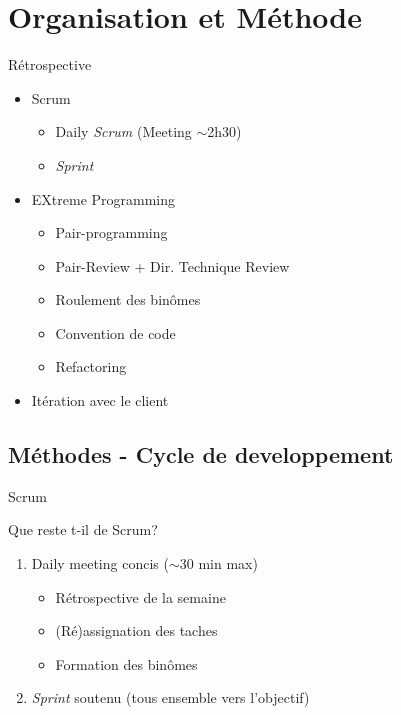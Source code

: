 \section{Organisation et Méthode}

\begin{frame}
  \begin{block}{Rétrospective}
    \begin{itemize}
      \item Scrum
        \begin{itemize}
          \item Daily \emph{Scrum} (Meeting $\sim$2h30)
          \item \emph{Sprint}
        \end{itemize}
      \item EXtreme Programming
        \begin{itemize}
          \item Pair-programming
          \item Pair-Review + Dir. Technique Review
          \item Roulement des binômes
          \item Convention de code
          \item Refactoring
        \end{itemize}
      \item Itération avec le client
   \end{itemize}
  \end{block}
\end{frame}

\subsection{Méthodes - Cycle de developpement}

\begin{frame}{Scrum}
  \begin{block}{Que reste t-il de Scrum?}
    \begin{enumerate}
      \item Daily meeting concis ($\sim$30 min max)
        \begin{itemize}
          \item Rétrospective de la semaine
          \item (Ré)assignation des taches
          \item Formation des binômes
        \end{itemize}
      \item \emph{Sprint} soutenu (tous ensemble vers l'objectif)
    \end{enumerate}
  \end{block}
\end{frame}

